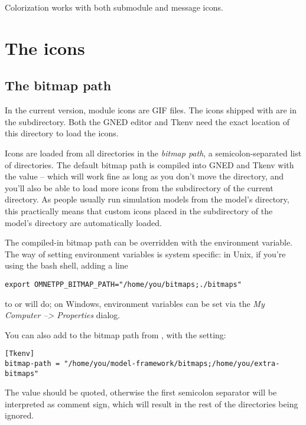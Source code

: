 Colorization works with both submodule and message icons.


\section{The icons}
\label{sec:ch-graphics:icon-library}

\subsection{The bitmap path}

In the current {\opp} version, module icons are GIF files. The icons shipped
with {\opp} are in the  subdirectory. Both the GNED editor
and Tkenv need the exact location of this directory to load the icons.

Icons are loaded from all directories in the \textit{bitmap path},
a semicolon-separated list of directories.
The default bitmap path is compiled into GNED and Tkenv with the value
 -- which will work fine
as long as you don't move the directory, and you'll also be able to
load more icons from the  subdirectory of the current
directory. As people usually run simulation models from the model's
directory, this practically means that custom icons placed in the
 subdirectory of the model's directory are automatically
loaded.

The compiled-in bitmap path can be overridden with the 
environment variable. The way of setting environment variables is system
specific: in Unix, if you're using the bash shell, adding a line

\begin{verbatim}
export OMNETPP_BITMAP_PATH="/home/you/bitmaps;./bitmaps"
\end{verbatim}

to  or  will do; on Windows, environment variables
can be set via the \textit{My Computer --> Properties} dialog.

You can also add to the bitmap path from , with
the  setting:

\begin{verbatim}
[Tkenv]
bitmap-path = "/home/you/model-framework/bitmaps;/home/you/extra-bitmaps"
\end{verbatim}

The value should be quoted, otherwise the first semicolon separator will be
interpreted as comment sign, which will result in the rest of the
directories being ignored.



